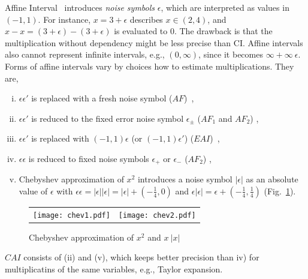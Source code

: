 \documentclass[runningheads,a4paper,oribibl]{llncs}
\begin{document}
Affine Interval~\cite{af,comba93} introduces \emph{noise symbols} $\epsilon$, 
which are interpreted as values in $(-1,1)$. 
For instance, $x = 3 + \epsilon$ describes $x \in (2,4)$, and 
$x - x = (3 + \epsilon) - (3 + \epsilon)$ is evaluated to $0$. 
The drawback is that the multiplication without dependency might be less precise than CI.
Affine intervals also cannot represent infinite intervals, e.g., $(0,\infty)$, 
since it becomes $\infty + \infty~\epsilon$. 
Forms of affine intervals vary by choices how to estimate multiplications. They are,
\begin{enumerate}[(i)]
\item $\epsilon \epsilon'$ is replaced with a fresh noise symbol 
($AF$)~\cite{StolfiThesis,comba93}, 
\item $\epsilon \epsilon'$ is reduced to the fixed error noise symbol 
$\epsilon_{\pm}$ ($AF_1$ and $AF_2$) \cite{af},
\item $\epsilon \epsilon'$ is replaced with $(-1,1) \epsilon$ 
(or $(-1,1) \epsilon'$) ($EAI$)~\cite{ngocsefm},
\item $\epsilon \epsilon$ is reduced to fixed noise symbols 
$\epsilon_+$ or $\epsilon_{-}$ ($AF_2$) \cite{af}, 
\item Chebyshev approximation of $x^2$ introduces a noise symbol $|\epsilon|$ 
as an absolute value of $\epsilon$ with 
$\epsilon \epsilon = |\epsilon| |\epsilon| = |\epsilon| + (-\frac{1}{4}, 0)$ and
$\epsilon |\epsilon| = \epsilon + (-\frac{1}{4}, \frac{1}{4})$ (Fig.~\ref{fig:chevabs}). 
\end{enumerate} 

\begin{figure}[ht]
\begin{minipage}[b]{1.0\linewidth}
\centering
\begin{tabular}{ll}
\texttt{[image: chev1.pdf]} &
\texttt{[image: chev2.pdf]}
\end{tabular}
\caption{Chebyshev approximation of $x^2$ and $x~|x|$}
\label{fig:chevabs}
\end{minipage}

\end{figure}

$CAI$ \cite{tapas12} consists of (ii) and (v), which keeps better precision than iv)
for multiplicatins of the same variables, e.g., Taylor expansion. 
\end{document}

